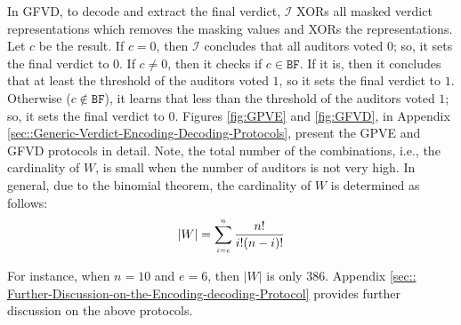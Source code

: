 In GFVD, to decode and extract the final verdict,  $\mathcal{I}$  XORs all masked verdict representations which removes the masking values and XORs the representations. Let $c$ be the result.  If $c=0$, then $\mathcal{I}$ concludes that all auditors voted $0$; so, it sets the final verdict to $0$. If $c\neq 0$, then it checks if $c\in \mathtt{BF}$. If it is, then it concludes that at least the threshold of the auditors voted $1$, so it sets the final verdict to $1$. Otherwise ($c\notin \mathtt{BF}$), it learns that less than the threshold of the auditors voted $1$; so, it sets the final verdict to $0$.  Figures \ref{fig:GPVE} and \ref{fig:GFVD}, in Appendix \ref{sec::Generic-Verdict-Encoding-Decoding-Protocols}, present the  GPVE and GFVD protocols in detail. Note, the total number of the combinations, i.e., the cardinality of $W$, is small when the number of auditors is not very high. In general,  due to the  binomial theorem, the cardinality of $W$ is determined as follows: 
%
$$|W|=\sum\limits_{\scriptscriptstyle i=e}^{\scriptscriptstyle n}\frac{n!}{i!(n- i)!}$$

%
 For instance, when $n=10$ and  $e=6$, then $|W|$ is only $386$. Appendix \ref{sec:: Further-Discussion-on-the-Encoding-decoding-Protocol} provides  further discussion on the above protocols.
 
 
% 
 
 
 
 

 
 




